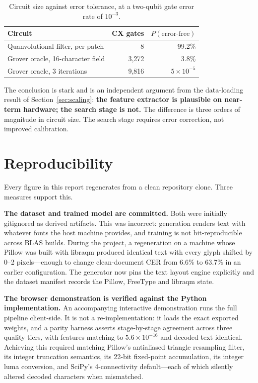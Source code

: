 \documentclass[11pt,a4paper]{article}
\begin{document}
\begin{table}[h]
\centering
\caption{Circuit size against error tolerance, at a two-qubit gate error rate of
$10^{-3}$.}
\begin{tabular}{@{}lrr@{}}
\toprule
Circuit & CX gates & $P(\text{error-free})$ \\
\midrule
Quanvolutional filter, per patch & 8 & 99.2\% \\
Grover oracle, 16-character field & 3{,}272 & 3.8\% \\
Grover oracle, 3 iterations & 9{,}816 & $5\times10^{-5}$ \\
\bottomrule
\end{tabular}
\end{table}

The conclusion is stark and is an independent argument from the data-loading
result of Section~\ref{sec:scaling}: \textbf{the feature extractor is plausible
on near-term hardware; the search stage is not.} The difference is three orders
of magnitude in circuit size. The search stage requires error correction, not
improved calibration.

\section{Reproducibility}
\label{sec:repro}

Every figure in this report regenerates from a clean repository clone. Three
measures support this.

\textbf{The dataset and trained model are committed.} Both were initially
gitignored as derived artifacts. This was incorrect: generation renders text with
whatever fonts the host machine provides, and training is not bit-reproducible
across BLAS builds. During the project, a regeneration on a machine whose Pillow
was built with libraqm produced identical text with every glyph shifted by 0--2
pixels---enough to change clean-document CER from 6.6\% to 63.7\% in an earlier
configuration. The generator now pins the text layout engine explicitly and the
dataset manifest records the Pillow, FreeType and libraqm state.

\textbf{The browser demonstration is verified against the Python
implementation.} An accompanying interactive demonstration runs the full pipeline
client-side. It is not a re-implementation: it loads the exact exported weights,
and a parity harness asserts stage-by-stage agreement across three quality tiers,
with features matching to $5.6\times10^{-16}$ and decoded text identical.
Achieving this required matching Pillow's antialiased triangle resampling filter,
its integer truncation semantics, its 22-bit fixed-point accumulation, its
integer luma conversion, and SciPy's 4-connectivity default---each of which
silently altered decoded characters when mismatched.
\end{document}
